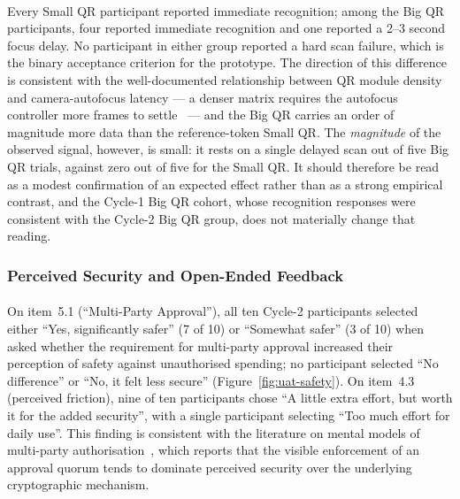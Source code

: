 \paragraph{}Every Small QR participant reported immediate recognition; among the Big QR participants, four reported immediate recognition and one reported a 2--3 second focus delay. No participant in either group reported a hard scan failure, which is the binary acceptance criterion for the prototype. The direction of this difference is consistent with the well-documented relationship between QR module density and camera-autofocus latency --- a denser matrix requires the autofocus controller more frames to settle~\cite{corpuz2025} --- and the Big QR carries an order of magnitude more data than the reference-token Small QR. The \textit{magnitude} of the observed signal, however, is small: it rests on a single delayed scan out of five Big QR trials, against zero out of five for the Small QR. It should therefore be read as a modest confirmation of an expected effect rather than as a strong empirical contrast, and the Cycle-1 Big QR cohort, whose recognition responses were consistent with the Cycle-2 Big QR group, does not materially change that reading.

\subsubsection{Perceived Security and Open-Ended Feedback}
\label{sect:results_uat_open}

\paragraph{}On item~5.1 (``Multi-Party Approval''), all ten Cycle-2 participants selected either ``Yes, significantly safer'' (7 of 10) or ``Somewhat safer'' (3 of 10) when asked whether the requirement for multi-party approval increased their perception of safety against unauthorised spending; no participant selected ``No difference'' or ``No, it felt less secure'' (Figure~\ref{fig:uat-safety}). On item~4.3 (perceived friction), nine of ten participants chose ``A little extra effort, but worth it for the added security'', with a single participant selecting ``Too much effort for daily use''. This finding is consistent with the literature on mental models of multi-party authorisation~\cite{komlo2021}, which reports that the visible enforcement of an approval quorum tends to dominate perceived security over the underlying cryptographic mechanism.

